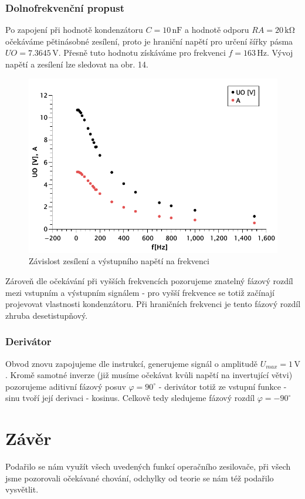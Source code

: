 \documentclass[czech,11pt,a4paper]{article}
\begin{document}
\begin{multicols}{2}
		\subsubsection{Dolnofrekvenční propust}
		Po zapojení při hodnotě kondenzátoru $C = 10 \,\mathrm{nF}$ a hodnotě odporu $RA =20 \,\mathrm{k\Omega}$ očekáváme pětinásobné zesílení, proto je hraniční napětí pro určení šířky pásma $UO = 7.3645 \,\mathrm{V}$.  Přesně tuto hodnotu získáváme pro frekvenci $f = 163 \,\mathrm{Hz}$.
		Vývoj napětí a zesílení lze sledovat na obr. 14.
		\begin{figure}[H]
			\centering
			\includegraphics[width=0.8\linewidth]{Graph6}
			\caption{Závislost zesílení a výstupního napětí na frekvenci}
		\end{figure}
		Zároveň dle očekávání při vyšších frekvencích pozorujeme znatelný fázový rozdíl mezi vstupním a výstupním signálem - pro vyšší frekvence se totiž začínají projevovat vlastnosti kondenzátoru. Při hraničních frekvenci je tento fázový rozdíl zhruba desetistupňový. 
		\subsubsection{Derivátor}
		Obvod znovu zapojujeme dle instrukcí, generujeme signál o amplitudě $U_{max} = 1\,\mathrm{V}$. Kromě samotné inverze (již musíme očekávat kvůli napětí na invertující větvi) pozorujeme aditivní fázový posuv $\varphi = 90^\circ$ - derivátor totiž ze vstupní funkce - sinu tvoří její derivaci - kosinus. Celkově tedy sledujeme fázový rozdíl $\varphi = -90^\circ$
		
	
		
		\section{Závěr}
		Podařilo se nám využít všech uvedených funkcí operačního zesilovače, při všech jsme pozorovali očekávané chování, odchylky od teorie se nám též podařilo vysvětlit.
	\end{multicols}
\printbibliography
			
		
		
\end{document}
